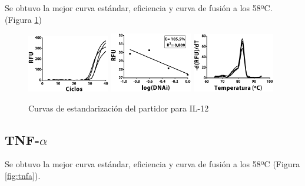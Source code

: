 \documentclass[12pt,letterpaper,oneside]{scrbook}
\begin{document}
Se obtuvo la mejor curva estándar, eficiencia y curva de fusión a los
58ºC. (Figura \ref{fig:il12})

\begin{figure}[h!]
    \centering
        {\includegraphics[width=0.32\textwidth]{standarization/il12/ampl}}
        {\includegraphics[width=0.32\textwidth]{standarization/il12/stand}}
        {\includegraphics[width=0.32\textwidth]{standarization/il12/melting}}
        \caption{Curvas de estandarización del partidor para IL-12}
        \label {fig:il12}
\end{figure}

\subsection{TNF-$\alpha$}

Se obtuvo la mejor curva estándar, eficiencia y curva de fusión a los
58ºC (Figura \ref{fig:tnfa}).
\end{document}
